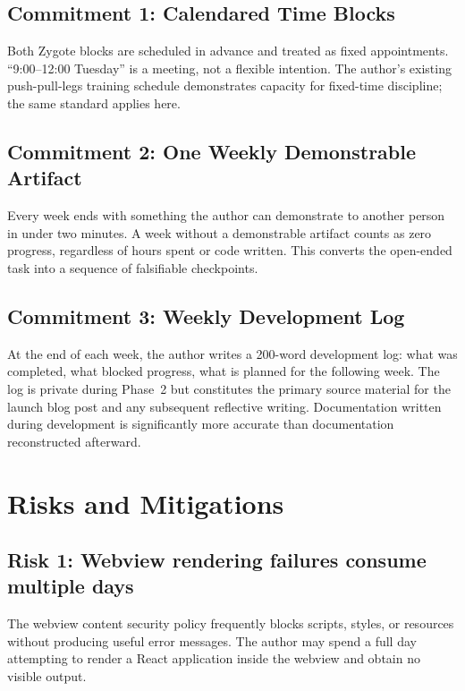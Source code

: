 \documentclass[11pt,letterpaper]{article}
\begin{document}
\subsection*{Commitment 1: Calendared Time Blocks}

Both Zygote blocks are scheduled in advance and treated as fixed appointments. ``9:00--12:00 Tuesday'' is a meeting, not a flexible intention. The author's existing push-pull-legs training schedule demonstrates capacity for fixed-time discipline; the same standard applies here.

\subsection*{Commitment 2: One Weekly Demonstrable Artifact}

Every week ends with something the author can demonstrate to another person in under two minutes. A week without a demonstrable artifact counts as zero progress, regardless of hours spent or code written. This converts the open-ended task into a sequence of falsifiable checkpoints.

\subsection*{Commitment 3: Weekly Development Log}

At the end of each week, the author writes a 200-word development log: what was completed, what blocked progress, what is planned for the following week. The log is private during Phase~2 but constitutes the primary source material for the launch blog post and any subsequent reflective writing. Documentation written during development is significantly more accurate than documentation reconstructed afterward.

\section{Risks and Mitigations}
\label{sec:risks}

\subsection*{Risk 1: Webview rendering failures consume multiple days}

The webview content security policy frequently blocks scripts, styles, or resources without producing useful error messages. The author may spend a full day attempting to render a React application inside the webview and obtain no visible output.
\end{document}
